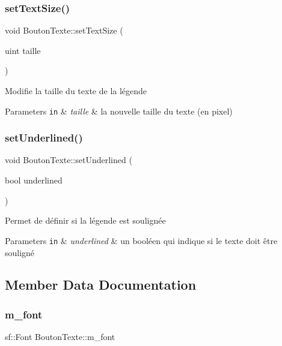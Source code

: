 \subsubsection{\texorpdfstring{set\+Text\+Size()}{setTextSize()}}
{\footnotesize\ttfamily void Bouton\+Texte\+::set\+Text\+Size (\begin{DoxyParamCaption}\item[{uint}]{taille }\end{DoxyParamCaption})}

Modifie la taille du texte de la légende 
\begin{DoxyParams}[1]{Parameters}
\mbox{\tt in}  & {\em taille} & la nouvelle taille du texte (en pixel) \\
\hline
\end{DoxyParams}
\mbox{\label{classBoutonTexte_a7fdc380e2cd49d2b8e6c57cb456cb8ae}} 
\subsubsection{\texorpdfstring{set\+Underlined()}{setUnderlined()}}
{\footnotesize\ttfamily void Bouton\+Texte\+::set\+Underlined (\begin{DoxyParamCaption}\item[{bool}]{underlined }\end{DoxyParamCaption})}

Permet de définir si la légende est soulignée 
\begin{DoxyParams}[1]{Parameters}
\mbox{\tt in}  & {\em underlined} & un booléen qui indique si le texte doit être souligné \\
\hline
\end{DoxyParams}


\subsection{Member Data Documentation}
\mbox{\label{classBoutonTexte_a92d3ce11bc4a1719d86458bad2f05849}} 
\subsubsection{\texorpdfstring{m\+\_\+font}{m\_font}}
{\footnotesize\ttfamily sf\+::\+Font Bouton\+Texte\+::m\+\_\+font\hspace{0.3cm}{\ttfamily [protected]}}



